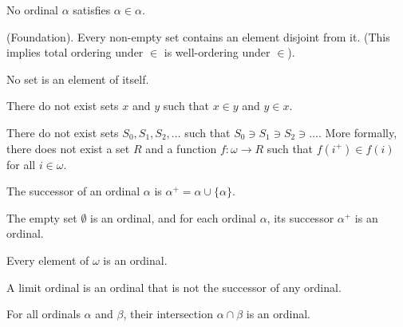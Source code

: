 \documentclass{report}
\begin{document}
\begin{lemma}
  No ordinal $\alpha$ satisfies $\alpha \in \alpha$.
\end{lemma}

\begin{axiom}
  {\normalfont (Foundation).} Every non-empty set contains an element disjoint from it. (This implies total ordering under $\in$ is well-ordering under $\in$). 
\end{axiom}

\begin{corollary}
  No set is an element of itself.
\end{corollary}

\begin{corollary}
  There do not exist sets $x$ and $y$ such that $x \in y$ and $y \in x$.
\end{corollary}

\begin{corollary}
  There do not exist sets $S_0,S_1,S_2,\dots$ such that $S_0 \ni S_1 \ni S_2 \ni \dots$. More formally, there does not exist a set $R$ and a function $f:\omega \rightarrow R$ such that $f(i^+) \in f(i)$ for all $i \in \omega$.
\end{corollary}

\begin{definition}
  The successor of an ordinal $\alpha$ is $\alpha^+ = \alpha \cup \{ \alpha \}$.
\end{definition}

\begin{definition}
  The empty set $\emptyset$ is an ordinal, and for each ordinal $\alpha$, its successor $\alpha^+$ is an ordinal.
\end{definition}

\begin{corollary}
  Every element of $\omega$ is an ordinal.
\end{corollary}

\begin{definition}
  A limit ordinal is an ordinal that is not the successor of any ordinal.
\end{definition}

\begin{lemma}
   For all ordinals $\alpha$ and $\beta$, their intersection $\alpha \cap \beta$ is an ordinal.
\end{lemma}
\end{document}
